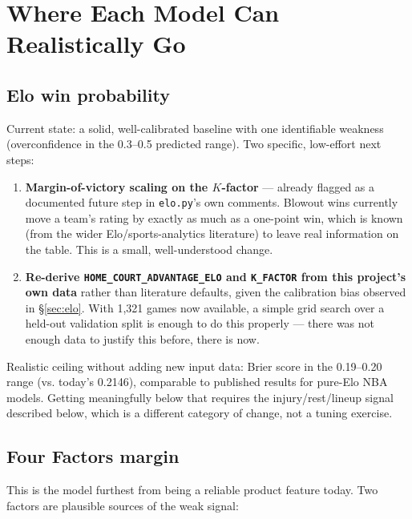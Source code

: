 \documentclass[11pt]{article}
\newcommand{\code}[1]{\allowbreak\texttt{\small #1}\allowbreak}
\begin{document}
\section{Where Each Model Can Realistically Go}

\subsection{Elo win probability}

Current state: a solid, well-calibrated baseline with one identifiable weakness (overconfidence in the
0.3--0.5 predicted range). Two specific, low-effort next steps:

\begin{enumerate}
    \item \textbf{Margin-of-victory scaling on the $K$-factor} — already flagged as a documented future step
    in \code{elo.py}'s own comments. Blowout wins currently move a team's rating by exactly as much as a
    one-point win, which is known (from the wider Elo/sports-analytics literature) to leave real information
    on the table. This is a small, well-understood change.
    \item \textbf{Re-derive \code{HOME\_COURT\_ADVANTAGE\_ELO} and \code{K\_FACTOR} from this project's own
    data} rather than literature defaults, given the calibration bias observed in \S\ref{sec:elo}. With
    1,321 games now available, a simple grid search over a held-out validation split is enough to do this
    properly — there was not enough data to justify this before, there is now.
\end{enumerate}

Realistic ceiling without adding new input data: Brier score in the 0.19--0.20 range (vs. today's 0.2146),
comparable to published results for pure-Elo NBA models. Getting meaningfully below that requires the
injury/rest/lineup signal described below, which is a different category of change, not a tuning exercise.

\subsection{Four Factors margin}

This is the model furthest from being a reliable product feature today. Two factors are plausible sources
of the weak signal:
\end{document}
